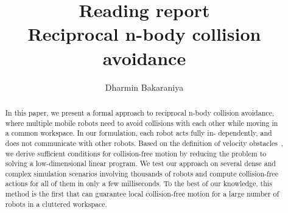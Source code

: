 \documentclass[12pt]{article}
\title{Reading report\\Reciprocal n-body collision avoidance\cite{van2011reciprocal}}
\author{Dharmin Bakaraniya}
\begin{document}
\maketitle{}

\begin{abstract}
    In this paper, we present a formal approach to reciprocal n-body collision
    avoidance, where multiple mobile robots need to avoid collisions with each other
    while moving in a common workspace. In our formulation, each robot acts fully in-
    dependently, and does not communicate with other robots. Based on the definition
    of velocity obstacles~\cite{fiorini1998motion}, we derive sufficient conditions for collision-free motion
    by reducing the problem to solving a low-dimensional linear program. We test our
    approach on several dense and complex simulation scenarios involving thousands
    of robots and compute collision-free actions for all of them in only a few milliseconds. To the best of our knowledge, this method is the first that can guarantee local
    collision-free motion for a large number of robots in a cluttered workspace.
\end{abstract}
\end{document}
